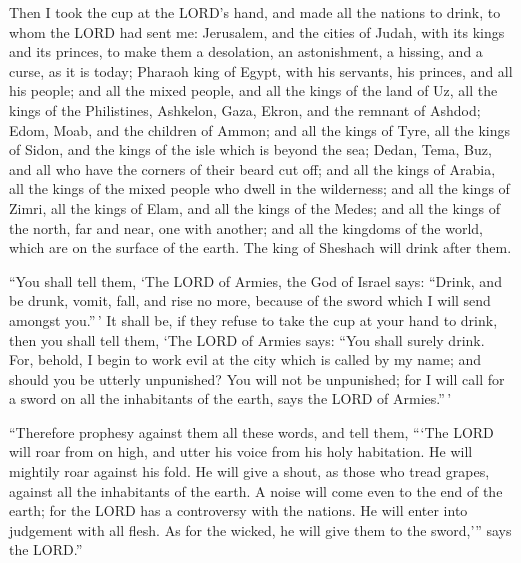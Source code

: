  Then I took the cup at the LORD's hand, and made all the
nations to drink, to whom the LORD had sent me:  Jerusalem,
and the cities of Judah, with its kings and its princes, to make them a
desolation, an astonishment, a hissing, and a curse, as it is today;
 Pharaoh king of Egypt, with his servants, his princes, and
all his people;  and all the mixed people, and all the
kings of the land of Uz, all the kings of the Philistines, Ashkelon,
Gaza, Ekron, and the remnant of Ashdod;  Edom, Moab, and
the children of Ammon;  and all the kings of Tyre, all the
kings of Sidon, and the kings of the isle which is beyond the sea;
 Dedan, Tema, Buz, and all who have the corners of their
beard cut off;  and all the kings of Arabia, all the kings
of the mixed people who dwell in the wilderness;  and all
the kings of Zimri, all the kings of Elam, and all the kings of the
Medes;  and all the kings of the north, far and near, one
with another; and all the kingdoms of the world, which are on the
surface of the earth. The king of Sheshach will drink after them.

 ``You shall tell them, `The LORD of Armies, the God of
Israel says: ``Drink, and be drunk, vomit, fall, and rise no more,
because of the sword which I will send amongst you.''\,' 
It shall be, if they refuse to take the cup at your hand to drink, then
you shall tell them, `The LORD of Armies says: ``You shall surely drink.
 For, behold, I begin to work evil at the city which is
called by my name; and should you be utterly unpunished? You will not be
unpunished; for I will call for a sword on all the inhabitants of the
earth, says the LORD of Armies.''\,'

 ``Therefore prophesy against them all these words, and
tell them, ```The LORD will roar from on high, and utter his voice from
his holy habitation. He will mightily roar against his fold. He will
give a shout, as those who tread grapes, against all the inhabitants of
the earth.  A noise will come even to the end of the earth;
for the LORD has a controversy with the nations. He will enter into
judgement with all flesh. As for the wicked, he will give them to the
sword,''' says the LORD.''

